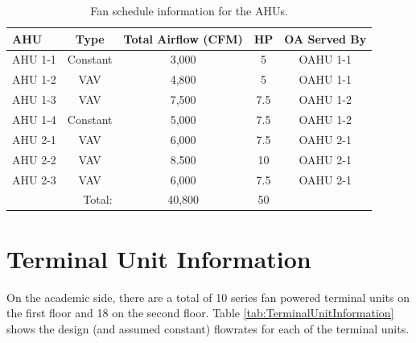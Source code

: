 \begin{table}
\centering
\caption{Fan schedule information for the AHUs.}
\label{tab:FanSched}
\begin{tabular}{l c c c c}
\toprule
AHU 	& Type	 	& Total Airflow (CFM) 	& HP 	& OA Served By\\
\midrule
AHU 1-1 & Constant  & 3,000 			  	& 5 	& OAHU 1-1 \\
AHU 1-2 & VAV 		& 4,800 				& 5 	& OAHU 1-1 \\
AHU 1-3 & VAV 		& 7,500 				& 7.5 	& OAHU 1-2 \\
AHU 1-4 & Constant 	& 5,000 				& 7.5 	& OAHU 1-2 \\
AHU 2-1 & VAV 		& 6,000 				& 7.5 	& OAHU 2-1 \\
AHU 2-2 & VAV		& 8.500					& 10 	& OAHU 2-1 \\
AHU 2-3 & VAV 		& 6,000					& 7.5	& OAHU 2-1 \\
\bottomrule
\multicolumn{2}{r}{Total:} & 40,800 & 50 &  \\
\end{tabular}
\end{table}

\section{Terminal Unit Information}

On the academic side, there are a total of 10 series fan powered terminal units on the first floor and 18 on the second floor. Table \ref{tab:TerminalUnitInformation} shows the design (and assumed constant) flowrates for each of the terminal units. 

